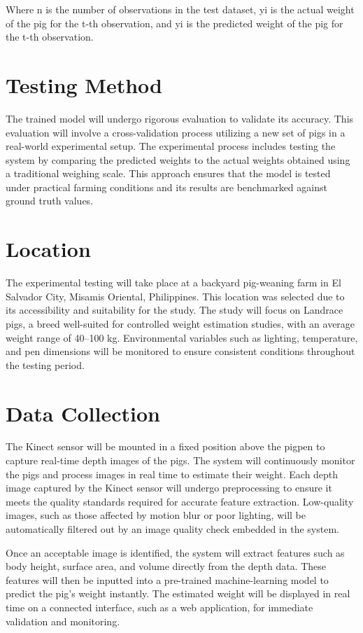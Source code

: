 {Where n is the number of observations in the test dataset, yi is the actual weight of the pig for the t-th observation, and yi is the predicted weight of the pig for the t-th observation.

\section{Testing Method}
The trained model will undergo rigorous evaluation to validate its accuracy. This evaluation will involve a cross-validation process utilizing a new set of pigs in a real-world experimental setup. The experimental process includes testing the system by comparing the predicted weights to the actual weights obtained using a traditional weighing scale. This approach ensures that the model is tested under practical farming conditions and its results are benchmarked against ground truth values.

\section{Location}
The experimental testing will take place at a backyard pig-weaning farm in El Salvador City, Misamis Oriental, Philippines. This location was selected due to its accessibility and suitability for the study. The study will focus on Landrace pigs, a breed well-suited for controlled weight estimation studies, with an average weight range of 40–100 kg. Environmental variables such as lighting, temperature, and pen dimensions will be monitored to ensure consistent conditions throughout the testing period.

\section{Data Collection}
The Kinect sensor will be mounted in a fixed position above the pigpen to capture real-time depth images of the pigs. The system will continuously monitor the pigs and process images in real time to estimate their weight. Each depth image captured by the Kinect sensor will undergo preprocessing to ensure it meets the quality standards required for accurate feature extraction. Low-quality images, such as those affected by motion blur or poor lighting, will be automatically filtered out by an image quality check embedded in the system.

Once an acceptable image is identified, the system will extract features such as body height, surface area, and volume directly from the depth data. These features will then be inputted into a pre-trained machine-learning model to predict the pig's weight instantly. The estimated weight will be displayed in real time on a connected interface, such as a web application, for immediate validation and monitoring.

}
